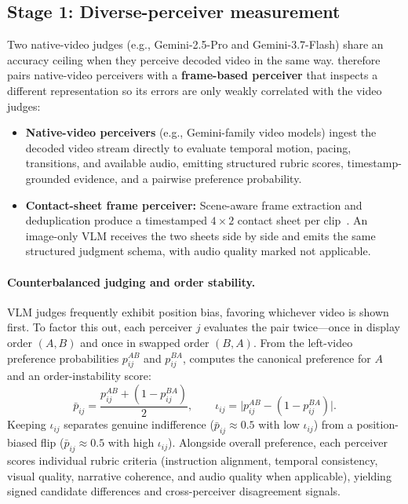 \subsection{Stage 1: Diverse-perceiver measurement}
\label{sec:perceivers}
Two native-video judges (e.g., Gemini-2.5-Pro and Gemini-3.7-Flash) share an accuracy ceiling when they perceive decoded video in the same way. \critical therefore pairs native-video perceivers with a \textbf{frame-based perceiver} that inspects a different representation so its errors are only weakly correlated with the video judges:
\begin{itemize}[leftmargin=*, topsep=2pt, itemsep=2pt]
  \item \textbf{Native-video perceivers} (e.g., Gemini-family video models) ingest the decoded video stream directly to evaluate temporal motion, pacing, transitions, and available audio, emitting structured rubric scores, timestamp-grounded evidence, and a pairwise preference probability.
  \item \textbf{Contact-sheet frame perceiver:} Scene-aware frame extraction and deduplication produce a timestamped $4\times 2$ contact sheet per clip~\cite{clauderealvideo}. An image-only VLM receives the two sheets side by side and emits the same structured judgment schema, with audio quality marked not applicable.
\end{itemize}

\paragraph{Counterbalanced judging and order stability.}
VLM judges frequently exhibit position bias, favoring whichever video is shown first. To factor this out, each perceiver $j$ evaluates the pair twice---once in display order $(A,B)$ and once in swapped order $(B,A)$. From the left-video preference probabilities $p^{AB}_{ij}$ and $p^{BA}_{ij}$, \critical computes the canonical preference for $A$ and an order-instability score:
\begin{equation}
\bar p_{ij}=\frac{p^{AB}_{ij}+(1-p^{BA}_{ij})}{2},
\qquad
\iota_{ij}=\bigl|p^{AB}_{ij}-(1-p^{BA}_{ij})\bigr|.
\label{eq:swap}
\end{equation}
Keeping $\iota_{ij}$ separates genuine indifference ($\bar p_{ij}\approx 0.5$ with low $\iota_{ij}$) from a position-biased flip ($\bar p_{ij}\approx 0.5$ with high $\iota_{ij}$). Alongside overall preference, each perceiver scores individual rubric criteria (instruction alignment, temporal consistency, visual quality, narrative coherence, and audio quality when applicable), yielding signed candidate differences and cross-perceiver disagreement signals.

